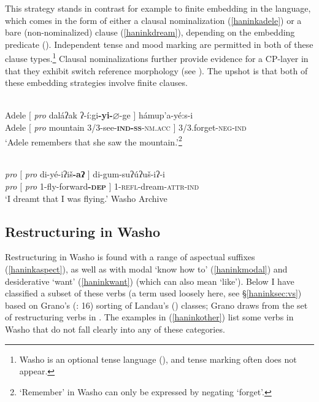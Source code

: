 \documentclass[output=paper]{langscibook}
\begin{document}
This strategy stands in contrast for example to finite embedding in the language, which comes in the form of either a clausal nominalization  (\ref{haninkadele}) or a bare (non-nominalized) clause (\ref{haninkdream}), depending on the embedding predicate (\citealt{haninkbochnak2018}). Independent tense and mood marking are permitted in both of these clause types.\footnote{Washo is an optional tense language (\citealt{bochnak2016}), and tense marking often does not appear.}  Clausal nominalizations further provide evidence for a CP-layer in that they exhibit switch reference morphology (see \citealt{arregihanink2018}). The upshot is that both of these embedding strategies involve finite clauses.

\\
\gll\label{haninkadele} Adele $[$ \textit{pro} daláʔak ʔ-í:gi\textbf{-yi-$\varnothing$}-ge $]$ hámup'a-yé:s-i\\
{} Adele $[$ \textit{pro} mountain 3/3-see-\textbf{\textsc{ind-ss}}\textsc{-nm.acc} $]$ 3/3.forget-\textsc{neg-ind}\\
\glt`Adele remembers that she saw the mountain.'\footnote{`Remember' in Washo can only be expressed by negating `forget'.}

\z 

\\
\gll\label{haninkdream} \textit{pro} $[$ \textit{pro} di-yé-{iʔ}iš{\bf-aʔ} $]$ di-gum-su{ʔ}ú{ʔ}uš-i{ʔ}-i \\
{} \textit{pro} $[$ \textit{pro} 1-fly-forward\textbf{-\textsc{dep}} $]$ 1-\textsc{refl}-dream-\textsc{attr-ind}\\
\glt `I dreamt that I was flying.' \hfill Washo Archive
\z

\subsection{Restructuring in Washo}
Restructuring in Washo is found with a range of aspectual suffixes (\ref{haninkaspect}), as well as with modal `know how to' (\ref{haninkmodal}) and  desiderative `want' (\ref{haninkwant}) (which can also mean `like'). Below I have classified a subset of these verbs (a term used loosely here, see \S\ref{haninksec:vs}) based on Grano's (\citeyear{grano2012diss}: 16) sorting of Landau's (\citeyear{landau2000}) classes; Grano draws from the set of restructuring verbs in \citet[342]{wurmbrand2001}. The examples in (\ref{haninkother}) list some verbs in Washo that do not fall clearly into any of these categories.
\end{document}
